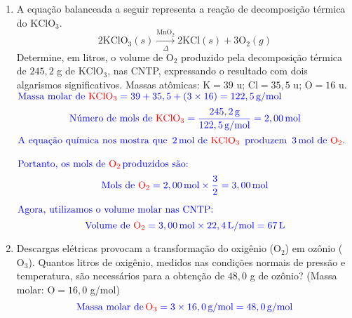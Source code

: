 \documentclass[a4paper, 12pt]{article}
\begin{document}
\begin{enumerate}

    \item A equação balanceada a seguir representa a reação de decomposição térmica
          do $\text{KClO}_{3}$.
          \[
              2\text{KClO}_{3}(s) \xrightarrow[\Delta]{\text{MnO}_2}2\text{KCl}(s) + 3\text{O}
              _{2}(g)
          \]
          Determine, em litros, o volume de $\text{O}_{2}$ produzido pela
          decomposição térmica de $245,2$ g de $\text{KClO}_{3}$, nas CNTP,
          expressando o resultado com dois algarismos significativos. Massas atômicas:
          $\text{K}= 39$ u; $\text{Cl}= 35,5$ u; $\text{O}= 16$ u.
          \\[10pt]
          $\textcolor{blue}{\text{Massa molar de \textcolor{red}{\(\text{KClO}_3\)}} = 39 + 35,5 + (3 \times 16) = 122,5 \, \text{g/mol}}$
          \[
              \textcolor{blue}{\text{Número de mols de \textcolor{red}{\(\text{KClO}_3\)}} = \frac{245,2 \, \text{g}}{122,5 \, \text{g/mol}} = 2,00 \, \text{mol}}
          \]
          $\textcolor{blue}{\text{A equação química nos mostra que } \, 2 \, \text{mol de \textcolor{red}{\(\text{KClO}_3\)}} \, \text{ produzem } \, 3 \, \text{mol de \textcolor{red}{\(\text{O}_2\)}}.}$
          \\ \\
          $\textcolor{blue}{\text{Portanto, os mols de \textcolor{red}{\(\text{O}_2\)}} \, \text{produzidos são:}}$
          \[
              \textcolor{blue}{\text{Mols de \textcolor{red}{\(\text{O}_2\)}} = 2,00 \, \text{mol} \times \frac{3}{2} = 3,00 \, \text{mol}}
          \]

          $\textcolor{blue}{\text{Agora, utilizamos o volume molar nas CNTP:}}$
          \[
              \textcolor{blue}{\text{Volume de \textcolor{red}{\(\text{O}_2\)}} = 3,00 \, \text{mol} \times 22,4 \, \text{L/mol} = 67 \, \text{L}}
          \]



    \item Descargas elétricas provocam a transformação do oxigênio ($\text{O}_{2}$)
          em ozônio ($\text{O}_{3}$). Quantos litros de oxigênio, medidos nas condições
          normais de pressão e temperatura, são necessários para a obtenção de
          $48,0$ g de ozônio? (Massa molar: $\text{O}= 16,0$ g/mol)
          \[
              \textcolor{blue}{\text{Massa molar de} \, \textcolor{red}{\text{O}_3} = 3 \times 16,0 \, \text{g/mol} = 48,0 \, \text{g/mol}}
          \]


\end{enumerate}
\end{document}
